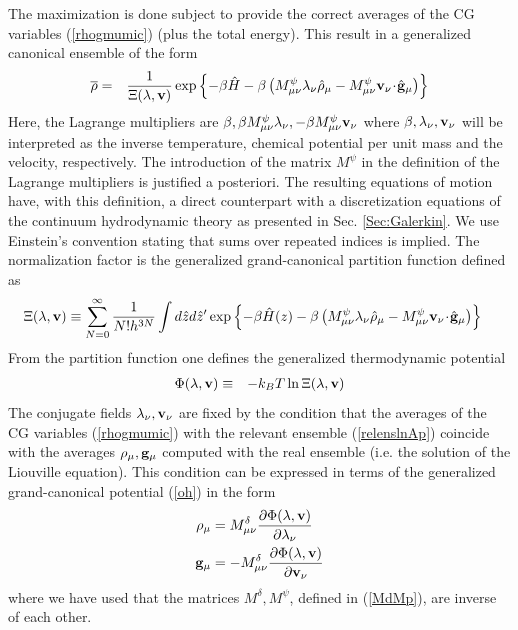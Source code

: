 \documentclass[b5paper,openright,11pt]{book}
\newcommand{\esc}{\!\cdot\!}
\begin{document}
\begin{appendices}
The maximization is done
subject  to  provide   the  correct  averages  of   the  CG  variables
(\ref{rhogmumic})  (plus   the  total   energy).  This  result   in  a
generalized canonical ensemble of the form
\begin{eqnarray}
  \overline{\rho}&=&\frac{1}{\Xi(\lambda,{\bf v})}\exp\left\{-\beta \hat{H}
-\beta\left(M^\psi_{\mu\nu}\lambda_\nu \hat{\rho}_{\mu}
-M^\psi_{\mu\nu}{\bf v}_\nu\esc\hat{\bf g}_{\mu}\right)\right\}
\label{relenslnAp}
\end{eqnarray}
Here,      the     Lagrange      multipliers     are      $\beta,\beta
M^\psi_{\mu\nu}\lambda_\nu,-\beta  M^\psi_{\mu\nu}{\bf   v}_\nu$  where
$\beta, \lambda_\nu,{\bf  v}_\nu$ will  be interpreted as  the inverse
temperature,  chemical  potential  per  unit mass  and  the  velocity,
respectively.
The introduction of the matrix $M^\psi$ in the definition of the Lagrange multipliers is justified a posteriori. 
The resulting equations of motion have, with this definition, a direct counterpart with a discretization equations of the continuum hydrodynamic theory as presented in Sec. \ref{Sec:Galerkin}.
We use Einstein’s convention stating that sums over repeated indices is implied.
The   normalization   factor   is   the   generalized
grand-canonical partition function defined as
\begin{align}
&\Xi(\lambda,{\bf v})\equiv \sum_{N=0}^\infty \frac{1}{N!h^{3N}}
  \int d\hat{z}d\hat{z}'
  \exp\left\{-\beta \hat{H}(z)-\beta\left( M^\psi_{\mu\nu}\lambda_\nu\hat{\rho}_{\mu}
-M^\psi_{\mu\nu}{\bf v}_\nu\esc\hat{\bf g}_{\mu}\right)\right\}
\label{xiln0}
\end{align}
From the partition function one defines the generalized thermodynamic potential
\begin{eqnarray}
  \Phi (\lambda,{\bf v})&\equiv&-k_BT \ln\Xi (\lambda,{\bf v})
\label{oh}
\end{eqnarray}
The  conjugate  fields  $\lambda_\nu,{\bf  v}_\nu$ are  fixed  by  the
condition that the averages of the CG variables (\ref{rhogmumic}) with
the  relevant ensemble  (\ref{relenslnAp})  coincide  with the  averages
$\rho_\mu,{\bf g}_\mu$ computed with the  real ensemble (i.e. the
solution of the Liouville equation). This condition can be expressed in terms of
the generalized grand-canonical potential (\ref{oh})
in the form
\begin{align}
  \rho_\mu &=M^\delta_{\mu\nu}\frac{\partial \Phi(\lambda,{\bf v})}{\partial \lambda_\nu }
\nonumber\\
  {\bf g}_\mu &=-M^\delta_{\mu\nu}\frac{\partial \Phi(\lambda,{\bf v})}{\partial {\bf v}_\nu }
\label{rgoApp}
\end{align}
where we have used that the matrices $M^\delta, M^\psi$, defined in (\ref{MdMp}), are inverse of
each other.  


\end{appendices}
\end{document}
